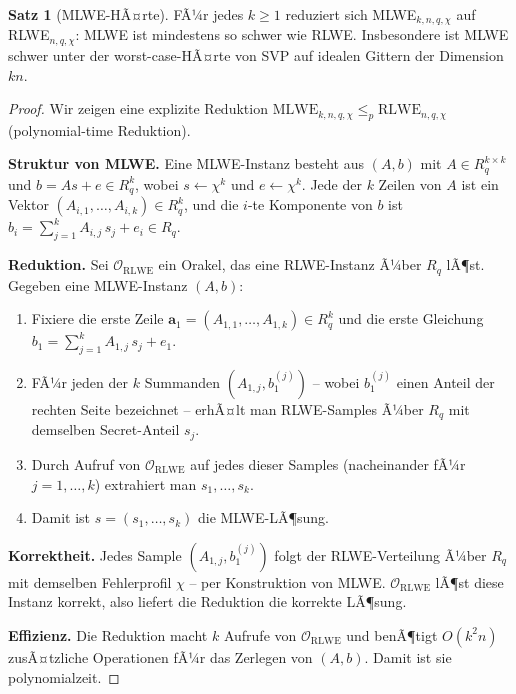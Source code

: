 ﻿\documentclass[a4paper,12pt]{article}
\theoremstyle{definition}
\newtheorem{satz}{Satz}[section]
\begin{document}
\begin{satz}[MLWE-HÃ¤rte]
FÃ¼r jedes $k \geq 1$ reduziert sich MLWE$_{k,n,q,\chi}$ auf RLWE$_{n,q,\chi}$:
MLWE ist mindestens so schwer wie RLWE. Insbesondere ist MLWE schwer unter der
worst-case-HÃ¤rte von SVP auf idealen Gittern der Dimension $kn$.
\end{satz}

\begin{proof}
Wir zeigen eine explizite Reduktion $\mathrm{MLWE}_{k,n,q,\chi}
\leq_p \mathrm{RLWE}_{n,q,\chi}$ (polynomial-time Reduktion).

\textbf{Struktur von MLWE.}
Eine MLWE-Instanz besteht aus $(A, b)$ mit
$A \in R_q^{k \times k}$ und $b = As + e \in R_q^k$,
wobei $s \leftarrow \chi^k$ und $e \leftarrow \chi^k$.
Jede der $k$ Zeilen von $A$ ist ein Vektor $(A_{i,1},\ldots,A_{i,k}) \in R_q^k$,
und die $i$-te Komponente von $b$ ist
$b_i = \sum_{j=1}^k A_{i,j}\,s_j + e_i \in R_q$.

\textbf{Reduktion.}
Sei $\mathcal{O}_\mathrm{RLWE}$ ein Orakel, das eine RLWE-Instanz Ã¼ber $R_q$ lÃ¶st.
Gegeben eine MLWE-Instanz $(A, b)$:

\begin{enumerate}
\item Fixiere die erste Zeile $\mathbf{a}_1 = (A_{1,1}, \ldots, A_{1,k}) \in R_q^k$
  und die erste Gleichung $b_1 = \sum_{j=1}^k A_{1,j}\,s_j + e_1$.

\item FÃ¼r jeden der $k$ Summanden $(A_{1,j}, b_1^{(j)})$ -- wobei $b_1^{(j)}$
  einen Anteil der rechten Seite bezeichnet -- erhÃ¤lt man RLWE-Samples
  Ã¼ber $R_q$ mit demselben Secret-Anteil $s_j$.

\item Durch Aufruf von $\mathcal{O}_\mathrm{RLWE}$ auf jedes dieser Samples
  (nacheinander fÃ¼r $j = 1,\ldots,k$) extrahiert man $s_1,\ldots,s_k$.

\item Damit ist $s = (s_1,\ldots,s_k)$ die MLWE-LÃ¶sung.
\end{enumerate}

\textbf{Korrektheit.}
Jedes Sample $(A_{1,j}, b_1^{(j)})$ folgt der RLWE-Verteilung Ã¼ber $R_q$
mit demselben Fehlerprofil $\chi$ -- per Konstruktion von MLWE.
$\mathcal{O}_\mathrm{RLWE}$ lÃ¶st diese Instanz korrekt, also liefert die
Reduktion die korrekte LÃ¶sung.

\textbf{Effizienz.}
Die Reduktion macht $k$ Aufrufe von $\mathcal{O}_\mathrm{RLWE}$ und benÃ¶tigt
$O(k^2 n)$ zusÃ¤tzliche Operationen fÃ¼r das Zerlegen von $(A, b)$.
Damit ist sie polynomialzeit.


\end{proof}
\end{document}
